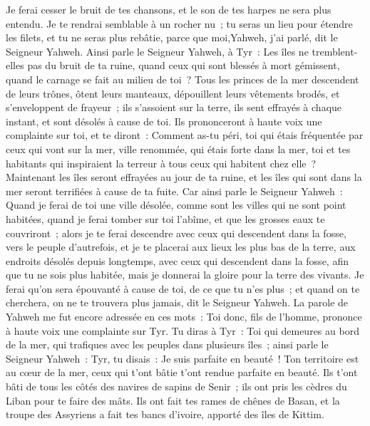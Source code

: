 \begin{multicols}{2}
Je ferai cesser le bruit de tes chansons, et le son de tes harpes ne sera plus entendu.
Je te rendrai semblable à un rocher nu~; tu seras un lieu pour étendre les filets, et tu ne seras plus rebâtie, parce que moi,Yahweh, j'ai parlé, dit le Seigneur Yahweh.
Ainsi parle le Seigneur Yahweh, à Tyr~: Les îles ne tremblent-elles pas du bruit de ta ruine, quand ceux qui sont blessés à mort gémissent, quand le carnage se fait au milieu de toi~?
Tous les princes de la mer descendent de leurs trônes, ôtent leurs manteaux, dépouillent leurs vêtements brodés, et s'enveloppent de frayeur~; ils s'assoient sur la terre, ils sent effrayés à chaque instant, et sont désolés à cause de toi.
Ils prononceront à haute voix une complainte sur toi, et te diront~: Comment as-tu péri, toi qui étais fréquentée par ceux qui vont sur la mer, ville renommée, qui étais forte dans la mer, toi et tes habitants qui inspiraient la terreur à tous ceux qui habitent chez elle~?
Maintenant les îles seront effrayées au jour de ta ruine, et les îles qui sont dans la mer seront terrifiées à cause de ta fuite.
Car ainsi parle le Seigneur Yahweh~: Quand je ferai de toi une ville désolée, comme sont les villes qui ne sont point habitées, quand je ferai tomber sur toi l'abîme, et que les grosses eaux te couvriront~;
alors je te ferai descendre avec ceux qui descendent dans la fosse, vers le peuple d'autrefois, et je te placerai aux lieux les plus bas de la terre, aux endroits désolés depuis longtemps, avec ceux qui descendent dans la fosse, afin que tu ne sois plus habitée, mais je donnerai la gloire pour la terre des vivants.
Je ferai qu'on sera épouvanté à cause de toi, de ce que tu n'es plus~; et quand on te cherchera, on ne te trouvera plus jamais, dit le Seigneur Yahweh.
\VerseOne{}La parole de Yahweh me fut encore adressée en ces mots~:
Toi donc, fils de l'homme, prononce à haute voix une complainte sur Tyr.
Tu diras à Tyr~: Toi qui demeures au bord de la mer, qui trafiques avec les peuples dans plusieurs îles~; ainsi parle le Seigneur Yahweh~: Tyr, tu disais~: Je suis parfaite en beauté~!
Ton territoire est au cœur de la mer, ceux qui t'ont bâtie t'ont rendue parfaite en beauté.
Ils t'ont bâti de tous les côtés des navires de sapins de Senir~; ils ont pris les cèdres du Liban pour te faire des mâts.
Ils ont fait tes rames de chênes de Basan, et la troupe des Assyriens a fait tes bancs d'ivoire, apporté des îles de Kittim.

\end{multicols}
